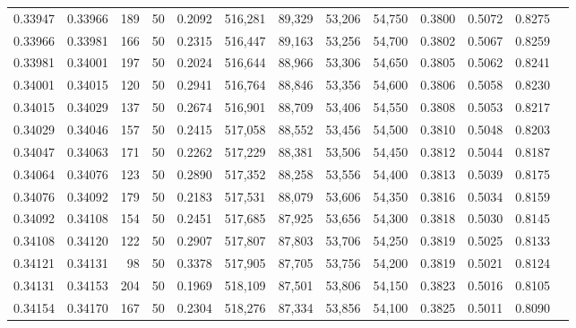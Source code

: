 \begin{tabular}{rrrrrrrrrrrrr}
0.33947 & 0.33966 &   189 &  50 &                                     0.2092 & 516,281 &  89,329 &  53,206 &  54,750 & 0.3800 & 0.5072 & 0.8275 \\
0.33966 & 0.33981 &   166 &  50 &                                     0.2315 & 516,447 &  89,163 &  53,256 &  54,700 & 0.3802 & 0.5067 & 0.8259 \\
0.33981 & 0.34001 &   197 &  50 &                                     0.2024 & 516,644 &  88,966 &  53,306 &  54,650 & 0.3805 & 0.5062 & 0.8241 \\
0.34001 & 0.34015 &   120 &  50 &                                     0.2941 & 516,764 &  88,846 &  53,356 &  54,600 & 0.3806 & 0.5058 & 0.8230 \\
0.34015 & 0.34029 &   137 &  50 &                                     0.2674 & 516,901 &  88,709 &  53,406 &  54,550 & 0.3808 & 0.5053 & 0.8217 \\
0.34029 & 0.34046 &   157 &  50 &                                     0.2415 & 517,058 &  88,552 &  53,456 &  54,500 & 0.3810 & 0.5048 & 0.8203 \\
0.34047 & 0.34063 &   171 &  50 &                                     0.2262 & 517,229 &  88,381 &  53,506 &  54,450 & 0.3812 & 0.5044 & 0.8187 \\
0.34064 & 0.34076 &   123 &  50 &                                     0.2890 & 517,352 &  88,258 &  53,556 &  54,400 & 0.3813 & 0.5039 & 0.8175 \\
0.34076 & 0.34092 &   179 &  50 &                                     0.2183 & 517,531 &  88,079 &  53,606 &  54,350 & 0.3816 & 0.5034 & 0.8159 \\
0.34092 & 0.34108 &   154 &  50 &                                     0.2451 & 517,685 &  87,925 &  53,656 &  54,300 & 0.3818 & 0.5030 & 0.8145 \\
0.34108 & 0.34120 &   122 &  50 &                                     0.2907 & 517,807 &  87,803 &  53,706 &  54,250 & 0.3819 & 0.5025 & 0.8133 \\
0.34121 & 0.34131 &    98 &  50 &                                     0.3378 & 517,905 &  87,705 &  53,756 &  54,200 & 0.3819 & 0.5021 & 0.8124 \\
0.34131 & 0.34153 &   204 &  50 &                                     0.1969 & 518,109 &  87,501 &  53,806 &  54,150 & 0.3823 & 0.5016 & 0.8105 \\
0.34154 & 0.34170 &   167 &  50 &                                     0.2304 & 518,276 &  87,334 &  53,856 &  54,100 & 0.3825 & 0.5011 & 0.8090 \\

\end{tabular}
